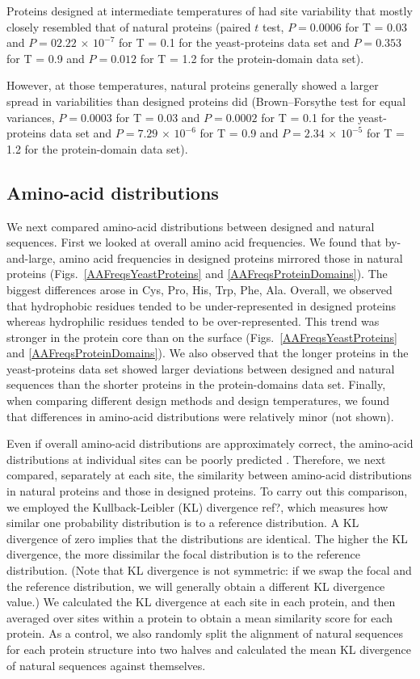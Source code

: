 \documentclass[12pt]{article}
\begin{document}
{\color{red} Proteins designed at intermediate temperatures of had site variability that mostly closely resembled that of natural proteins (paired $t$ test, $P= 0.0006$ for T = 0.03 and $P= 02.22$ $\times$  $10^{-7}$  for T  = 0.1 for the yeast-proteins data set and $P= 0.353$ for   T = 0.9 and $P = 0.012 $ for T = 1.2 for the protein-domain data set). 

However, at those temperatures, natural proteins generally showed a larger spread in variabilities than designed proteins did (Brown–Forsythe test for equal variances,  $P= 0.0003$ for T = 0.03 and $P=0.0002$ for T = 0.1 for the yeast-proteins data set and $P= 7.29$  $\times$  $10^{-6}$ for T = 0.9 and  $P= 2.34$ $\times $ $10^{-5}$ for T = 1.2  for the protein-domain data set).}

\subsection{Amino-acid distributions}
\label{AminoAcidDistributions}

We next compared amino-acid distributions between designed and natural sequences. First we looked at overall amino acid frequencies. We found that by-and-large, amino acid frequencies in designed proteins mirrored those in natural proteins (Figs.~\ref{AAFreqsYeastProteins} and \ref{AAFreqsProteinDomains}). The biggest differences arose in Cys, Pro, His, Trp, Phe, Ala. Overall, we observed that hydrophobic residues tended to be under-represented in designed proteins whereas hydrophilic residues tended to be over-represented. This trend was stronger in the protein core than on the surface (Figs.~\ref{AAFreqsYeastProteins} and \ref{AAFreqsProteinDomains}). We also observed that the longer proteins in the yeast-proteins data set showed larger deviations between designed and natural sequences than the shorter proteins in the protein-domains data set. Finally, when comparing different design methods and design temperatures, we found that differences in amino-acid distributions were relatively minor (not shown).

Even if overall amino-acid distributions are approximately correct, the amino-acid distributions at individual sites can be poorly predicted \cite{Ramsey2011}. Therefore, we next compared, separately at each site, the similarity between amino-acid distributions in natural proteins and those in designed proteins. To carry out this comparison, we employed the Kullback-Leibler (KL) divergence {\color{red}ref?}, which measures how similar one probability distribution is to a reference distribution. A KL divergence of zero implies that the distributions are identical. The higher the KL divergence, the more dissimilar the focal distribution is to the reference distribution. (Note that KL divergence is not symmetric: if we swap the focal and the reference distribution, we will generally obtain a different KL divergence value.) We calculated the KL divergence at each site in each protein, and then averaged over sites within a protein to obtain a mean similarity score for each protein. As a control, we also randomly split the alignment of natural sequences for each protein structure into two halves and calculated the mean KL divergence of natural sequences against themselves.
\end{document}
